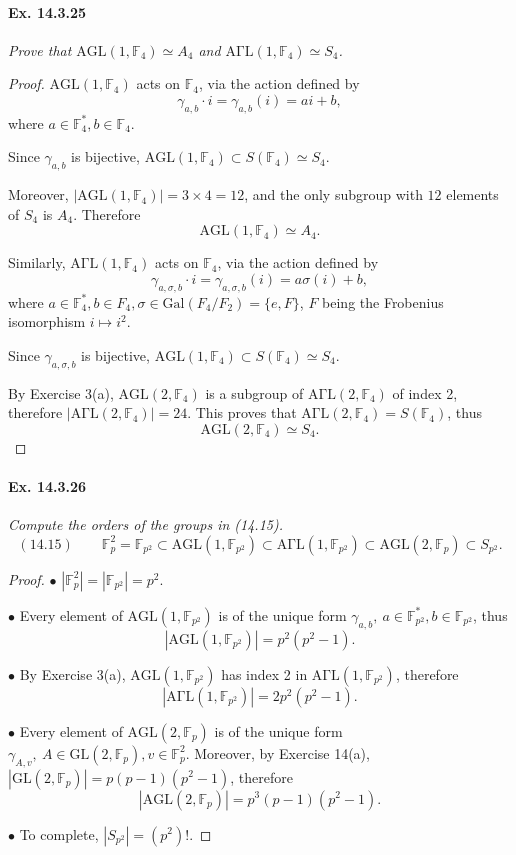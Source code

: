 \documentclass[11pt,a4paper]{article}
\newcommand{\F}{\mathbb{F}}
\newcommand{\Gal}{\mathrm{Gal}}
\begin{document}
{\paragraph{Ex. 14.3.25}{\it Prove that $\mathrm{AGL}(1,\F_4) \simeq A_4$ and $\mathrm{A\Gamma L}(1,\F_4) \simeq S_4$.
}
\begin{proof}
$\mathrm{AGL}(1,\F_4)$ acts on $\F_4$, via the action defined by $$\gamma_{a,b} \cdot i = \gamma_{a,b}(i) = ai +b,$$ where $a \in \F_4^*, b \in \F_4$.

Since $\gamma_{a,b}$ is bijective, $\mathrm{AGL}(1,\F_4) \subset S(\F_4) \simeq S_4$.

Moreover, $|\mathrm{AGL}(1,\F_4)| = 3 \times 4 = 12$, and the only subgroup with $12$ elements of $S_4$ is $A_4$. Therefore 
$$\mathrm{AGL}(1,\F_4) \simeq A_4.$$

Similarly, $\mathrm{A\Gamma L}(1,\F_4)$ acts on $\F_4$, via the action defined by 
$$\gamma_{a,\sigma,b} \cdot i = \gamma_{a,\sigma,b}(i) = a \sigma(i) + b,$$
where $a \in \F_4^*, b \in F_4, \sigma \in \Gal(F_4/F_2) = \{e,F\}$, $F$ being the Frobenius isomorphism $i \mapsto i^2$.

Since $\gamma_{a,\sigma,b}$ is bijective, $\mathrm{AGL}(1,\F_4) \subset S(\F_4) \simeq S_4$.

By Exercise 3(a), $\mathrm{AGL}(2,\F_4)$ is a subgroup of $\mathrm{A\Gamma L}(2,\F_4)$ of index 2, therefore $|\mathrm{A\Gamma L}(2,\F_4) | = 24$. This proves that $\mathrm{A\Gamma L}(2,\F_4) = S(\F_4)$, thus
$$\mathrm{AGL}(2,\F_4) \simeq S_4.$$
\end{proof}

\paragraph{Ex. 14.3.26}{\it Compute the orders of the groups in (14.15).
}
$$(14.15)\qquad \F_p^2 = \F_{p^2}  \subset \mathrm{AGL}(1,\F_{p^2}) \subset \mathrm{A\Gamma L}(1,\F_{p^2}) \subset \mathrm{AGL}(2,\F_p) \subset S_{p^2}.$$
\begin{proof}
 \item[$\bullet$] $|\F_p^2| = |\F_{p^2}| = p^2.$
 \item[$\bullet$] Every element of $\mathrm{AGL}(1,\F_{p^2})$ is of the unique form $\gamma_{a,b},\  a \in \F_{p^2}^*, b \in \F_{p^2}$, thus
  $$|\mathrm{AGL}(1,\F_{p^2})| = p^2(p^2-1).$$
   \item[$\bullet$] By Exercise 3(a), $\mathrm{AGL}(1,\F_{p^2})$ has index 2 in  $\mathrm{A\Gamma L}(1,\F_{p^2})$, therefore
   $$| \mathrm{A\Gamma L}(1,\F_{p^2})| = 2p^2(p^2-1).$$
   \item[$\bullet$] Every element of $\mathrm{AGL}(2,\F_{p})$ is of the unique form $\gamma_{A,v},\  A \in \mathrm{GL}(2,\F_p), v \in \F_{p}^2$.
   Moreover, by Exercise 14(a), $|\mathrm{GL}(2,\F_p)| = p(p-1)(p^2-1)$, therefore
   $$|\mathrm{AGL}(2,\F_{p})| = p^3(p-1)(p^2-1).$$
   \item[$\bullet$]  To complete, $|S_{p^2}| = (p^2)!$.
\end{proof}

}
\end{document}
